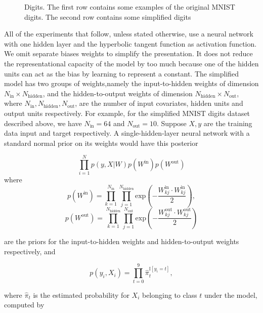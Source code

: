 \documentclass[12pt]{report}
\begin{document}
\begin{figure}
\begin{tcbraster}[raster columns=5, enhanced, blankest]

\end{tcbraster}
\caption{Digits. The first row contains some examples of the original MNIST digits. The second row contains some simplified digits}
\end{figure}

All of the experiments that follow, unless stated otherwise, use a neural network with one hidden layer and the hyperbolic tangent function as activation function. We omit separate biases weights to simplify the presentation. It does not reduce the representational capacity of the model by too much because one of the hidden units can act as the bias by learning to represent a constant. The simplified model has two groups of weights,namely the input-to-hidden weights of dimension $N_{\text{in}} \times N_{\text{hidden}}$, and the hidden-to-output weights of dimension $N_{\text{hidden}} \times N_{\text{out}} $, where $N_{\text{in}},N_{\text{hidden}},N_{\text{out}}$, are the number of input covariates, hidden units and output units respectively. For example, for the simplified MNIST digits dataset described above, we have $N_{\text{in}} = 64 $ and $N_{\text{out}} = 10 $. Suppose $X,y$ are the training data input and target respectively. A single-hidden-layer neural network with a standard normal prior on its weights would have this posterior 

\[ \prod_{i=1}^N p(y,X|W) p(W^{\text{in}})p(W^{\text{out}}) \]
where 
\[p(W^{\text{in}}) = \prod_{k=1}^{N_{\text{in}}}\prod_{j=1}^{N_{\text{hidden}}} \text{exp}(- \frac{W_{kj}^{\text{in}} \cdot W_{kj}^{\text{in}}}{2}), \]
\[p(W^{\text{out}}) = \prod_{k=1}^{N_{\text{hidden}}}\prod_{j=1}^{N_{\text{out}}} \text{exp}(- \frac{W_{kj}^{\text{out}} \cdot W_{kj}^{\text{out}}}{2}) \]

are the priors for the input-to-hidden weights and hidden-to-output weights respectively, and 

\[ p(y_i,X_i) = \prod_{t=0}^9 \hat{\pi}_t^{\mathbb{I}[y_i=t]}, \]

where $\hat{\pi}_t$ is the estimated probability for $X_i$ belonging to class $t$ under the model, computed by 
\end{document}

